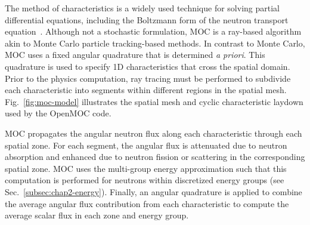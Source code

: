 The method of characteristics is a widely used technique for solving partial differential equations, including the Boltzmann form of the neutron transport equation~\cite{askew1972moc}. Although not a stochastic formulation, \ac{MOC} is a ray-based algorithm akin to Monte Carlo particle tracking-based methods. In contrast to Monte Carlo, \ac{MOC} uses a fixed angular quadrature that is determined \textit{a priori}. This quadrature is used to specify 1D characteristics that cross the spatial domain. Prior to the physics computation, ray tracing must be performed to subdivide each characteristic into segments within different regions in the spatial mesh. Fig.~\ref{fig:moc-model} illustrates the spatial mesh and cyclic characteristic laydown used by the OpenMOC code.

\ac{MOC} propagates the angular neutron flux along each characteristic through each spatial zone. For each segment, the angular flux is attenuated due to neutron absorption and enhanced due to neutron fission or scattering in the corresponding spatial zone. \ac{MOC} uses the multi-group energy approximation such that this computation is performed for neutrons within discretized energy groups (see Sec.~\ref{subsec:chap2-energy}). Finally, an angular quadrature is applied to combine the average angular flux contribution from each characteristic to compute the average scalar flux in each zone and energy group.

